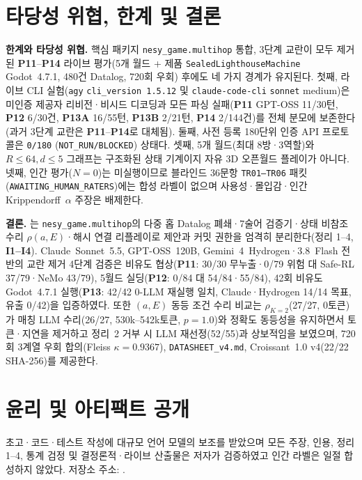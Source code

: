 \FloatBarrier
\section{타당성 위협, 한계 및 결론}\label{sec:conclusion}
\textbf{한계와 타당성 위협.} 핵심 패키지 \texttt{nesy\_game.multihop} 통합, 3단계 교란이 모두 제거된 \textbf{P11}--\textbf{P14} 라이브 평가(5개 월드 + 제품 \texttt{SealedLighthouseMachine} Godot~4.7.1, 480건 Datalog, 720회 우회) 후에도 네 가지 경계가 유지된다. 첫째, 라이브 CLI 실험(\texttt{agy} \texttt{cli\_version~1.5.12} 및 \texttt{claude-code-cli} \texttt{sonnet} medium)은 미인증 제공자 리비전·비시드 디코딩과 모든 파싱 실패(\textbf{P11} GPT-OSS 11/30턴, \textbf{P12} 6/30건, \textbf{P13A} 16/55턴, \textbf{P13B} 2/21턴, \textbf{P14} 2/144건)를 전체 분모에 보존한다(과거 3단계 교란은 \textbf{P11}--\textbf{P14}로 대체됨). 둘째, 사전 등록 180단위 인증 API 프로토콜은 \texttt{0/180} (\texttt{NOT\_RUN/BLOCKED}) 상태다. 셋째, 5개 월드(최대 8방·3역할)와 $R{\le}64, d{\le}5$ 그래프는 구조화된 상태 기계이지 자유 3D 오픈월드 플레이가 아니다. 넷째, 인간 평가($N{=}0$)는 미실행이므로 블라인드 36문항 \texttt{TR01--TR06} 패킷(\texttt{AWAITING\_}\allowbreak\texttt{HUMAN\_}\allowbreak\texttt{RATERS})에는 합성 라벨이 없으며 사용성·몰입감·인간 Krippendorff~$\alpha$ 주장은 배제한다.

\textbf{결론.} \system{}는 \texttt{nesy\_game.multihop}의 다중 홉 Datalog 폐쇄·7술어 검증기·상태 비참조 수리 $\rho(a,E)$·해시 연결 리플레이로 제안과 커밋 권한을 엄격히 분리한다(정리 1--4, \textbf{I1--I4}). Claude~Sonnet~5.5, GPT-OSS~120B, Gemini~4~Hydrogen·3.8~Flash 전반의 교란 제거 4단계 검증은 비유도 협상(\textbf{P11}: 30/30 무누출·0/79 위험 대 Safe-RL 37/79·NeMo 43/79), 5월드 실딩(\textbf{P12}: 0/84 대 54/84·55/84), 42회 비유도 Godot~4.7.1 실행(\textbf{P13}: 42/42 0-LLM 재실행 일치, Claude·Hydrogen 14/14 목표, 유출 0/42)을 입증하였다. 또한 $(a,E)$ 동등 조건 수리 비교는 $\rho_{K=2}$(27/27, 0토큰)가 매칭 LLM 수리(26/27, 530k--542k토큰, $p{=}1.0$)와 정확도 동등성을 유지하면서 토큰·지연을 제거하고 정리~2 거부 시 LLM 재선정(52/55)과 상보적임을 보였으며, 720회 3계열 우회 합의(Fleiss $\kappa{=}0.9367$), \texttt{DATASHEET\_v4.md}, Croissant~1.0 v4(22/22 SHA-256)를 제공한다.

\section*{윤리 및 아티팩트 공개}
초고·코드·테스트 작성에 대규모 언어 모델의 보조를 받았으며 모든 주장, 인용, 정리 1--4, 통계 검정 및 결정론적·라이브 산출물은 저자가 검증하였고 인간 라벨은 일절 합성하지 않았다. 저장소 주소: \RepoURL.